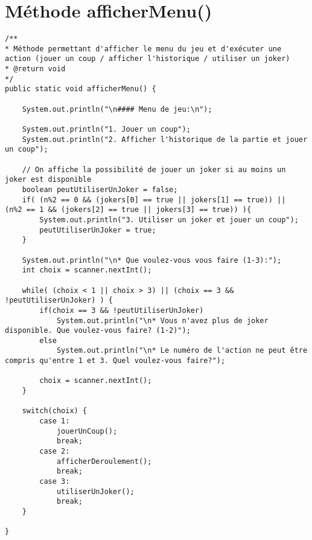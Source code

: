 \documentclass[11pt,a4paper]{report}
\begin{document}
    \section{Méthode afficherMenu()}
        \begin{lstlisting}
/**
* Méthode permettant d'afficher le menu du jeu et d'exécuter une action (jouer un coup / afficher l'historique / utiliser un joker)
* @return void
*/
public static void afficherMenu() {

    System.out.println("\n#### Menu de jeu:\n");

    System.out.println("1. Jouer un coup");
    System.out.println("2. Afficher l'historique de la partie et jouer un coup");

    // On affiche la possibilité de jouer un joker si au moins un joker est disponible
    boolean peutUtiliserUnJoker = false;
    if( (n%2 == 0 && (jokers[0] == true || jokers[1] == true)) ||  (n%2 == 1 && (jokers[2] == true || jokers[3] == true)) ){    
        System.out.println("3. Utiliser un joker et jouer un coup");
        peutUtiliserUnJoker = true;
    }

    System.out.println("\n* Que voulez-vous vous faire (1-3):");
    int choix = scanner.nextInt();

    while( (choix < 1 || choix > 3) || (choix == 3 && !peutUtiliserUnJoker) ) {
        if(choix == 3 && !peutUtiliserUnJoker)
            System.out.println("\n* Vous n'avez plus de joker disponible. Que voulez-vous faire? (1-2)");
        else
            System.out.println("\n* Le numéro de l'action ne peut être compris qu'entre 1 et 3. Quel voulez-vous faire?");

        choix = scanner.nextInt();      
    }

    switch(choix) {
        case 1:
            jouerUnCoup();
            break;
        case 2:
            afficherDeroulement();
            break;
        case 3:
            utiliserUnJoker();
            break;  
    }

}
        \end{lstlisting}

        \newpage
\end{document}
